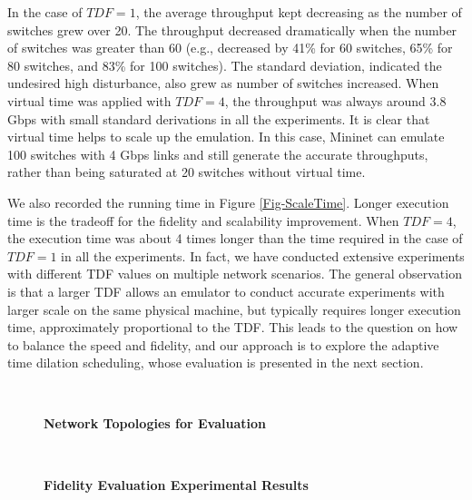 In the case of $TDF = 1$, the average throughput kept decreasing as the number of switches grew over 20. The throughput decreased dramatically when the number of switches was greater than 60 (e.g., decreased by 41\% for 60 switches, 65\% for 80 switches, and 83\% for 100 switches). The standard deviation, indicated the undesired high disturbance, also grew as number of switches increased. When virtual time was applied with $TDF = 4$, the throughput was always around 3.8 Gbps with small standard derivations in all the experiments. It is clear that virtual time helps to scale up the emulation. In this case, Mininet can emulate 100 switches with 4 Gbps links and still generate the accurate throughputs, rather than being saturated at 20 switches without virtual time. 

We also recorded the running time in Figure \ref{Fig-ScaleTime}. Longer execution time is the tradeoff for the fidelity and scalability improvement. When $TDF=4$, the execution time was about 4 times longer than the time required in the case of $TDF=1$ in all the experiments. In fact, we have conducted extensive experiments with different TDF values on multiple network scenarios. The general observation is that a larger TDF allows an emulator to conduct accurate experiments with larger scale on the same physical machine, but typically requires longer execution time, approximately proportional to the TDF.  This leads to the question on how to balance the speed and fidelity, and our approach is to explore the adaptive time dilation scheduling, whose evaluation is presented in the next section. 

\begin{figure*}
\centering
	~
	\caption{\textbf{Network Topologies for Evaluation}}
\end{figure*}

\begin{figure*}
\centering
	~

\caption{\textbf{Fidelity Evaluation Experimental Results}}
\end{figure*}

